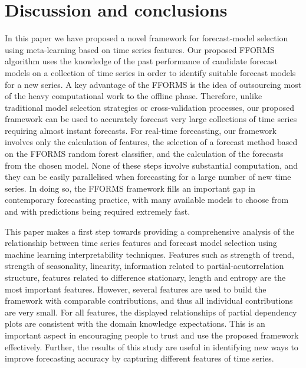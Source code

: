 \documentclass[11pt,a4paper,]{article}
\begin{document}
\hypertarget{discussion}{%
\section{Discussion and conclusions}\label{discussion}}

In this paper we have proposed a novel framework for forecast-model selection using meta-learning based on time series features. Our proposed FFORMS algorithm uses the knowledge of the past performance of candidate forecast models on a collection of time series in order to identify suitable forecast models for a new series. A key advantage of the FFORMS is the idea of outsourcing most of the heavy computational work to the offline phase. Therefore, unlike traditional model selection strategies or cross-validation processes, our proposed framework can be used to accurately forecast very large collections of time series requiring almost instant forecasts. For real-time forecasting, our framework involves only the calculation of features, the selection of a forecast method based on the FFORMS random forest classifier, and the calculation of the forecasts from the chosen model. None of these steps involve substantial computation, and they can be easily parallelised when forecasting for a large number of new time series. In doing so, the FFORMS framework
fills an important gap in contemporary forecasting practice, with many available models
to choose from and with predictions being required extremely fast.

This paper makes a first step towards providing a comprehensive analysis of the relationship between time series features and forecast model selection using machine learning interpretability techniques. Features such as strength of trend, strength of seasonality, linearity, information related to partial-acutorrelation structure, features related to difference stationary, length and entropy are the most important features. However, several features are used to build the framework with comparable contributions, and thus all individual contributions are very small. For all features, the displayed relationships of partial dependency plots are consistent with the domain knowledge expectations. This is an important aspect in encouraging people to trust and use the proposed framework effectively. Further, the results of this study are useful in identifying new ways to improve forecasting accuracy by capturing different features of time series.
\end{document}
